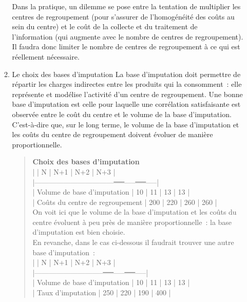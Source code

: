 \documentclass{tufte-handout}
\begin{document}
\begin{enumerate}
\begin{enumerate}
Dans la pratique, un dilemme se pose entre la tentation de multiplier les centres de regroupement (pour s'assurer de l'homogénéité des coûts au sein du centre) et le coût de la collecte et du traitement de\\
l'information (qui augmente avec le nombre de centres de regroupement).\\
Il faudra donc limiter le nombre de centres de regroupement à ce qui est réellement nécessaire.\\

\item Le choix des bases d'imputation
\label{sec:org2e6650b}
La base d'imputation doit permettre de répartir les charges indirectes entre les produits qui la consomment : elle représente et modélise l'activité d'un centre de regroupement. Une bonne base d'imputation est celle pour laquelle une corrélation satisfaisante est observée entre le coût du centre et le volume de la base d'imputation. C'est-à-dire que, sur le long terme, le volume de la base d'imputation et les coûts du centre de regroupement doivent évoluer de manière proportionnelle.\\

\begin{verse}
\textbf{Choix des bases d'imputation}\\
\vspace*{1em}
|                                 | N   | N+1 | N+2 | N+3 |\\
|---------------------------------\sout{-----}-----\sout{-----}-----|\\
| Volume de base d'imputation     | 10  | 11  | 13  | 13  |\\
| Coûts du centre de regroupement | 200 | 220 | 260 | 260 |\\
\vspace*{1em}
On voit ici que le volume de la base d'imputation et les coûts du centre évoluent à peu près de manière proportionnelle : la base d'imputation est bien choisie.\\
\vspace*{1em}
En revanche, dans le cas ci-dessous il faudrait trouver une autre base d'imputation :\\
\vspace*{1em}
|                             | N   | N+1 | N+2 | N+3 |\\
|-----------------------------\sout{-----}-----\sout{-----}-----|\\
| Volume de base d'imputation | 10  | 11  | 13  | 13  |\\
| Taux d'imputation           | 250 | 220 | 190 | 400 |\\
\end{verse}


\end{enumerate}
\end{enumerate}
\end{document}
